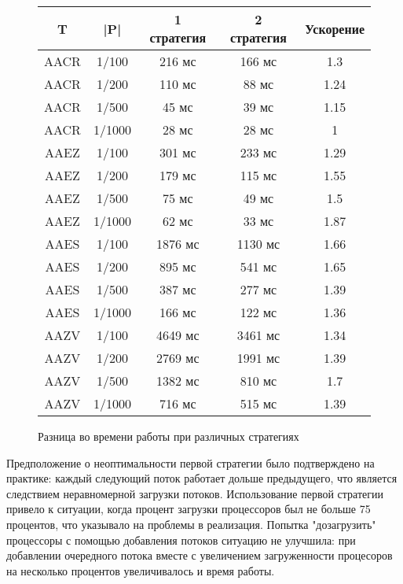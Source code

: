 \documentclass[14pt]{article}
\begin{document}
\begin{figure}
\begin{center}
\begin{tabular}{ | c | c | c | c | c |}
        \hline T &  |P| & 1 стратегия & 2 стратегия & Ускорение\\
        \hline AACR & 1/100 & 216 мс & 166 мс & 1.3\\
        \hline AACR & 1/200 & 110 мс & 88 мс & 1.24\\
        \hline AACR & 1/500 & 45 мс & 39 мс & 1.15\\
 		\hline AACR & 1/1000 & 28 мс & 28 мс & 1\\
              
        \hline AAEZ & 1/100 & 301 мс & 233 мс & 1.29 \\
        \hline AAEZ & 1/200 & 179 мс & 115 мс & 1.55 \\
        \hline AAEZ & 1/500 & 75 мс & 49 мс & 1.5\\
        \hline AAEZ & 1/1000 & 62 мс & 33 мс & 1.87\\
        
  		\hline AAES & 1/100 & 1876 мс & 1130 мс & 1.66 \\
        \hline AAES & 1/200 & 895 мс & 541 мс & 1.65 \\
        \hline AAES & 1/500 & 387 мс & 277 мс & 1.39 \\
        \hline AAES & 1/1000 & 166 мс & 122 мс & 1.36 \\
     
  		\hline AAZV & 1/100 & 4649 мс & 3461 мс & 1.34 \\
        \hline AAZV & 1/200 & 2769 мс & 1991 мс & 1.39 \\
        \hline AAZV & 1/500 & 1382 мс & 810 мс & 1.7 \\
        \hline AAZV & 1/1000 & 716 мс & 515 мс & 1.39 \\
     
		\hline
    \end{tabular}
        \end{center}

    \caption{Разница во времени работы при различных стратегиях}
    \label{typical_research}
\end{figure}

Предположение о неоптимальности первой стратегии было подтверждено на практике: каждый следующий поток работает дольше предыдущего, что является следствием неравномерной загрузки потоков. Использование первой стратегии привело к ситуации, когда процент загрузки процессоров был не больше 75 процентов, что указывало на проблемы в реализация. Попытка "дозагрузить" процессоры с помощью добавления потоков ситуацию не улучшила: при добавлении очередного потока вместе с увеличением загруженности процесоров на несколько процентов увеличивалось и время работы. 
\end{document}
